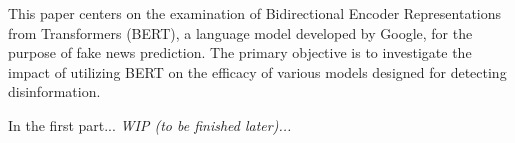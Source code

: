 This paper centers on the examination of Bidirectional Encoder Representations from Transformers (BERT), a language model developed by Google, for the purpose of fake news prediction. The primary objective is to investigate the impact of utilizing BERT on the efficacy of various models designed for detecting disinformation.


In the first part... \textit{WIP (to be finished later)...}